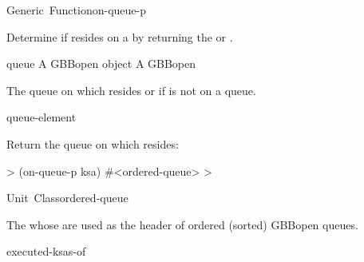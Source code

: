 \documentclass[10pt,twoside,english,pdftex]{article}
\begin{document}
\begin{functiondoc}{Generic~Function}{on-queue-p}{ 
    \returns{} }
%
%

\fnsyntax

\fnpurpose Determine if  resides on a
  by returning the  or \nil.

\fnmethods
{}

\fnpackage {}

\fnmodule {}

\fnargs
\begin{args}{queue}
 A GBBopen  object
\arg[queue] A GBBopen 
\end{args}

\fnreturns The  queue on which 
resides or \nil{} if  is not on a queue.
  
\begin{alsos}{queue-element}
\end{alsos}

\fnexample
Return the queue on which  resides:
%
\W\supp
\begin{example}
  > (on-queue-p ksa)
  #<ordered-queue>
  >
\end{example}

\end{functiondoc}


\begin{functiondoc}{Unit~Class}{ordered-queue}{}
%
%

\fnsyntax

\fnpackage {}

\fnmodule {}

\fndescription The  whose  are used 
as the header of ordered (sorted) GBBopen queues.

\begin{alsos}{executed-ksas-of}
\also[on-queue-p]
\also[queue]
\end{alsos}

\end{functiondoc}
\end{document}
